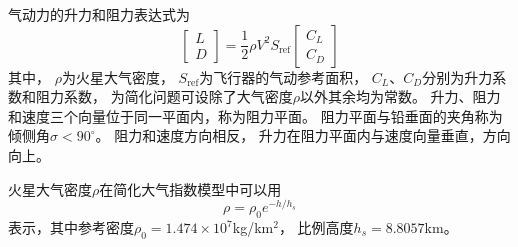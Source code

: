 气动力的升力和阻力表达式为
\begin{equation*}
    \left[\begin{matrix}
        L \\ D
    \end{matrix}\right]
    = \frac{1}{2}\rho V^2S_{\text{ref}}
    \left[\begin{matrix}
        C_L \\ C_D
    \end{matrix}\right]
\end{equation*}
其中，
$\rho$为火星大气密度，
$S_{\text{ref}}$为飞行器的气动参考面积，
$C_L$、$C_D$分别为升力系数和阻力系数，
为简化问题可设除了大气密度$\rho$以外其余均为常数。
升力、阻力和速度三个向量位于同一平面内，称为阻力平面。
阻力平面与铅垂面的夹角称为倾侧角$\sigma<90^{\circ}$。
阻力和速度方向相反，
升力在阻力平面内与速度向量垂直，方向向上。

火星大气密度$\rho$在简化大气指数模型中可以用
\[\rho=\rho_0e^{-h/h_s}\]
表示，其中参考密度$\rho_0=1.474\times10^7$kg/km$^2$，
比例高度$h_s=8.8057$km。
